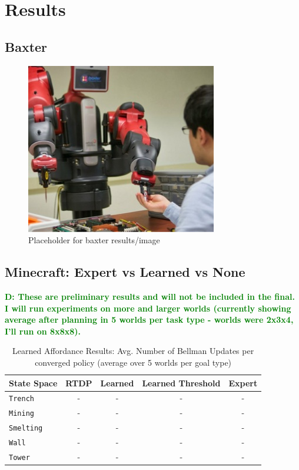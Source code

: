 \documentclass[conference]{IEEEtran}
\newcommand{\dnote}[1]{\textcolor{Green}{\textbf{D: #1}}}
\begin{document}
\section{Results}
\label{sec:results}

\subsection{Baxter}

\begin{figure}[H]
\centering
\includegraphics[scale=0.195]{figures/baxter_temp.jpg}%
  \caption{Placeholder for baxter results/image}
  \label{fig:baxter_results}
\end{figure}

\subsection{Minecraft: Expert vs Learned vs None}

\dnote{These are preliminary results and will not be included in the final. I will run experiments on more and larger worlds (currently showing average after planning in 5 worlds per task type - worlds were 2x3x4, I'll run on 8x8x8).}


\begin{table}[H]
\centering
\begin{tabular}{ l || c c c c }
  State Space & RTDP & Learned & Learned Threshold & Expert 	\\ \hline
  \texttt{Trench}  	& 	-	&	-		&	-	&	-	\\
  \texttt{Mining}  	& 	-	&	-		&	-	&	-  	\\
  \texttt{Smelting}  	& 	-	&	-		&	-	&	-  	\\
  \texttt{Wall}  		& 	-	&	-		&	-	&	-	\\
  \texttt{Tower}  		& 	-	&	-		&	-	&	- 	\\
\end{tabular}
\caption{Learned Affordance Results: Avg. Number of Bellman Updates per converged policy (average over 5 worlds per goal type)}
\label{table:minecraft_results_bellman}
\end{table}
\end{document}
